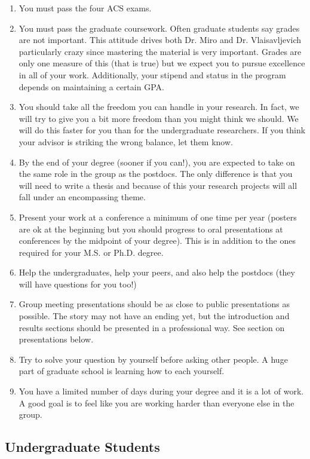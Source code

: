 \documentclass[letterpaper]{article}
\begin{document}
\begin{enumerate}
\item You must pass the four ACS exams.
\item You must pass the graduate coursework. Often graduate students say grades are not important. This attitude drives both Dr. Miro and Dr. Vlaisavljevich particularly crazy since mastering the material is very important. Grades are only one measure of this (that is true) but we expect you to pursue excellence in all of your work.  Additionally, your stipend and status in the program depends on maintaining a certain GPA.
\item You should take all the freedom you can handle in your research. In fact, we will try to give you a bit more freedom than you might think we should.  We will do this faster for you than for the undergraduate researchers. If you think your advisor is striking the wrong balance, let them know.
\item By the end of your degree (sooner if  you can!), you are expected to take on the same role in the group as the postdocs. The only difference is that you will need to write a thesis and because of this your research projects will all fall under an encompassing theme.
\item Present your work at a conference a minimum of one time per year (posters are ok at the beginning but you should progress to oral presentations at conferences by the midpoint of your degree). This is in addition to the ones required for your M.S. or Ph.D. degree.
\item Help the undergraduates, help your peers, and also help the postdocs (they will have questions for you too!)
\item Group meeting presentations should be as close to public presentations as possible. The story may not have an ending yet, but the introduction and results sections should be presented in a professional way. See section on presentations below.
\item Try to solve your question by yourself before asking other people. A huge part of graduate school is learning how to each yourself.
\item You have a limited number of days during your degree and it is a lot of work. A good goal is to feel like you are working harder than everyone else in the group.
\end{enumerate}


\subsection*{Undergraduate Students}
\end{document}
